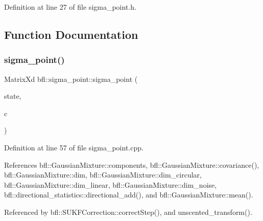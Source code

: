 Definition at line 27 of file sigma\+\_\+point.\+h.



\subsection{Function Documentation}
\mbox{\label{namespacebfl_1_1sigma__point_ab919aca5fccc30ee2acd5cd966cd9dc9}} 
\subsubsection{\texorpdfstring{sigma\+\_\+point()}{sigma\_point()}}
{\footnotesize\ttfamily Matrix\+Xd bfl\+::sigma\+\_\+point\+::sigma\+\_\+point (\begin{DoxyParamCaption}\item[{const \mbox{\hyperlink{classbfl_1_1GaussianMixture}{Gaussian\+Mixture}} \&}]{state,  }\item[{const double}]{c }\end{DoxyParamCaption})}



Definition at line 57 of file sigma\+\_\+point.\+cpp.



References bfl\+::\+Gaussian\+Mixture\+::components, bfl\+::\+Gaussian\+Mixture\+::covariance(), bfl\+::\+Gaussian\+Mixture\+::dim, bfl\+::\+Gaussian\+Mixture\+::dim\+\_\+circular, bfl\+::\+Gaussian\+Mixture\+::dim\+\_\+linear, bfl\+::\+Gaussian\+Mixture\+::dim\+\_\+noise, bfl\+::directional\+\_\+statistics\+::directional\+\_\+add(), and bfl\+::\+Gaussian\+Mixture\+::mean().



Referenced by bfl\+::\+S\+U\+K\+F\+Correction\+::correct\+Step(), and unscented\+\_\+transform().

